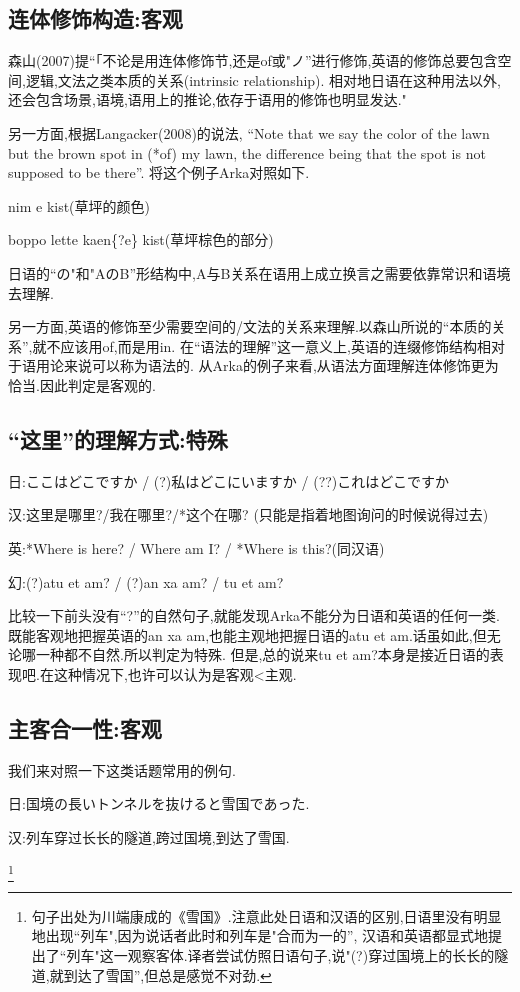 \subsection{连体修饰构造:客观}

森山(2007)提``「不论是用连体修饰节,还是of或"ノ''进行修饰,英语的修饰总要包含空间,逻辑,文法之类本质的关系(intrinsic relationship).
相对地日语在这种用法以外,还会包含场景,语境,语用上的推论,依存于语用的修饰也明显发达."

另一方面,根据Langacker(2008)的说法,
“Note that we say the color of the lawn but the brown spot in (*of) my lawn, 
the difference being that the spot is not supposed to be there”.
将这个例子Arka对照如下.

nim e kist(草坪的颜色)

boppo lette kaen\{?e\} kist(草坪棕色的部分)

日语的``の"和"AのB''形结构中,A与B关系在语用上成立换言之需要依靠常识和语境去理解.

另一方面,英语的修饰至少需要空间的/文法的关系来理解.以森山所说的``本质的关系'',就不应该用of,而是用in.
在“语法的理解”这一意义上,英语的连缀修饰结构相对于语用论来说可以称为语法的.
从Arka的例子来看,从语法方面理解连体修饰更为恰当.因此判定是客观的.

\subsection{``这里''的理解方式:特殊}

日:ここはどこですか / (?)私はどこにいますか / (??)これはどこですか

汉:这里是哪里?/我在哪里?/*这个在哪?	(只能是指着地图询问的时候说得过去)

英:*Where is here? / Where am I? / *Where is this?(同汉语)

幻:(?)atu et am? / (?)an xa am? / tu et am?

比较一下前头没有``?''的自然句子,就能发现Arka不能分为日语和英语的任何一类.
既能客观地把握英语的an xa am,也能主观地把握日语的atu et am.话虽如此,但无论哪一种都不自然.所以判定为特殊.
但是,总的说来tu et am?本身是接近日语的表现吧.在这种情况下,也许可以认为是客观<主观.
\subsection{主客合一性:客观}

我们来对照一下这类话题常用的例句.
{\kaishu
日:国境の長いトンネルを抜けると雪国であった.

汉:列车穿过长长的隧道,跨过国境,到达了雪国.}
\footnote{句子出处为川端康成的《雪国》.注意此处日语和汉语的区别,日语里没有明显地出现``列车",因为说话者此时和列车是"合而为一的'',
汉语和英语都显式地提出了``列车"这一观察客体.译者尝试仿照日语句子,说"(?)穿过国境上的长长的隧道,就到达了雪国'',但总是感觉不对劲.
}

